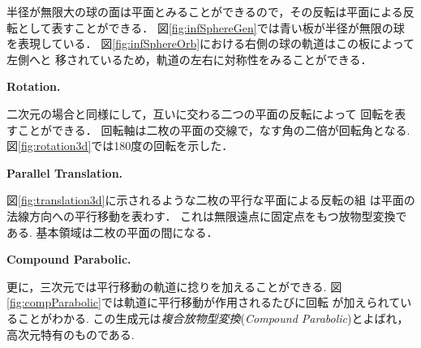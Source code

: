 半径が無限大の球の面は平面とみることができるので，その反転は平面による反
転として表すことができる．
図\ref{fig:infSphereGen}では青い板が半径が無限の球を表現している．
図\ref{fig:infSphereOrb}における右側の球の軌道はこの板によって左側へと
移されているため，軌道の左右に対称性をみることができる．

\noindent\textbf{Rotation.}

二次元の場合と同様にして，互いに交わる二つの平面の反転によって
回転を表すことができる．
回転軸は二枚の平面の交線で，なす角の二倍が回転角となる.
図\ref{fig:rotation3d}では180度の回転を示した．

\noindent\textbf{Parallel Translation.}

図\ref{fig:translation3d}に示されるような二枚の平行な平面による反転の組
は平面の法線方向への平行移動を表わす．
これは無限遠点に固定点をもつ放物型変換である.
基本領域は二枚の平面の間になる．

\noindent\textbf{Compound Parabolic.}

更に，三次元では平行移動の軌道に捻りを加えることができる.
図\ref{fig:compParabolic}では軌道に平行移動が作用されるたびに回転
が加えられていることがわかる.
この生成元は\emph{複合放物型変換}(\textit{Compound Parabolic})とよばれ，
高次元特有のものである.

